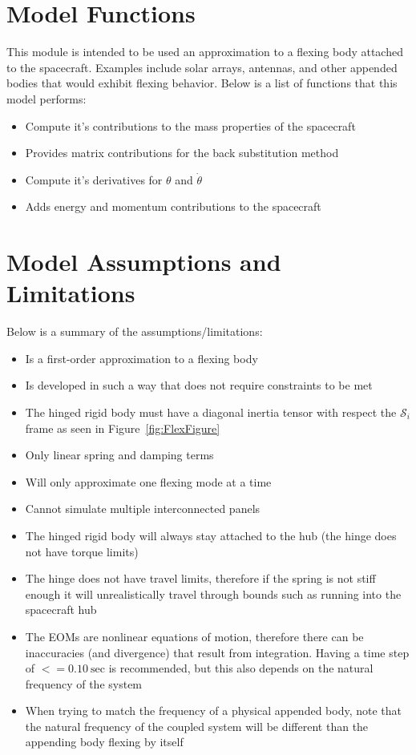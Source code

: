 \section{Model Functions}

This module is intended to be used an approximation to a flexing body attached to the spacecraft. Examples include solar arrays, antennas, and other appended bodies that would exhibit flexing behavior. Below is a list of functions that this model performs:

\begin{itemize}
	\item Compute it's contributions to the mass properties of the spacecraft
	\item Provides matrix contributions for the back substitution method
	\item Compute it's derivatives for $\theta$ and $\dot{\theta}$
	\item Adds energy and momentum contributions to the spacecraft
\end{itemize}

\section{Model Assumptions and Limitations}
Below is a summary of the assumptions/limitations:

\begin{itemize}
	\item Is a first-order approximation to a flexing body
	\item Is developed in such a way that does not require constraints to be met
	\item The hinged rigid body must have a diagonal inertia tensor with respect the $\mathcal{S}_i$ frame as seen in Figure~\ref{fig:FlexFigure}
	\item Only linear spring and damping terms
	\item Will only approximate one flexing mode at a time
	\item Cannot simulate multiple interconnected panels
	\item The hinged rigid body will always stay attached to the hub (the hinge does not have torque limits)
	\item The hinge does not have travel limits, therefore if the spring is not stiff enough it will unrealistically travel through bounds such as running into the spacecraft hub
	\item The EOMs are nonlinear equations of motion, therefore there can be inaccuracies (and divergence) that result from integration. Having a time step of $<= 0.10\ \text{sec}$ is recommended, but this also depends on the natural frequency of the system
	\item When trying to match the frequency of a physical appended body, note that the natural frequency of the coupled system will be different than the appending body flexing by itself
\end{itemize}
